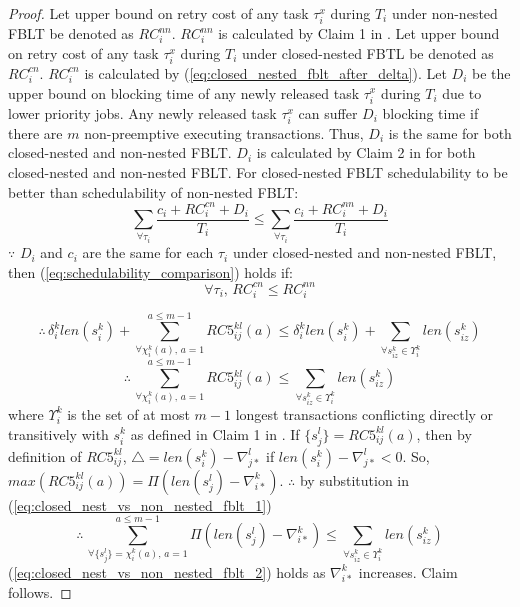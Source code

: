 \documentclass[letter]{sig-alternate}
\begin{document}
\begin{proof}

Let upper bound on retry cost of any task $\tau_{i}^{x}$ during $T_{i}$
under non-nested FBLT be denoted as $RC_{i}^{nn}$. $RC_{i}^{nn}$
is calculated by Claim 1 in \cite{fblt}. Let upper bound on retry
cost of any task $\tau_{i}^{x}$ during $T_{i}$ under closed-nested
FBTL be denoted as $RC_{i}^{cn}$. $RC_{i}^{cn}$ is calculated by
(\ref{eq:closed_nested_fblt_after_delta}). Let $D_{i}$ be the upper
bound on blocking time of any newly released task $\tau_{i}^{x}$
during $T_{i}$ due to lower priority jobs. Any newly released task
$\tau_{i}^{x}$ can suffer $D_{i}$ blocking time if there are $m$
non-preemptive executing transactions. Thus, $D_{i}$ is the same
for both closed-nested and non-nested FBLT. $D_{i}$ is calculated
by Claim 2 in \cite{fblt} for both closed-nested and non-nested FBLT.
For closed-nested FBLT schedulability to be better than schedulability
of non-nested FBLT: 
\begin{equation}
\sum_{\forall\tau_{i}}\frac{c_{i}+RC_{i}^{cn}+D_{i}}{T_{i}}\le\sum_{\forall\tau_{i}}\frac{c_{i}+RC_{i}^{nn}+D_{i}}{T_{i}}\label{eq:schedulability_comparison}
\end{equation}
$\because$ $D_{i}$ and $c_{i}$ are the same for each $\tau_{i}$
under closed-nested and non-nested FBLT, then (\ref{eq:schedulability_comparison})
holds if:
\[
\forall\tau_{i},\, RC_{i}^{cn}\le RC_{i}^{nn}
\]


\[
\therefore\,\delta_{i}^{k}len\left(s_{i}^{k}\right)+\sum_{\forall\chi_{i}^{k}(a),\, a=1}^{a\le m-1}RC5_{ij}^{kl}(a)\le\delta_{i}^{k}len\left(s_{i}^{k}\right)+\sum_{\forall s_{iz}^{k}\in\Upsilon_{i}^{k}}len\left(s_{iz}^{k}\right)
\]
\begin{equation}
\therefore\,\sum_{\forall\chi_{i}^{k}(a),\, a=1}^{a\le m-1}RC5{}_{ij}^{kl}(a)\le\sum_{\forall s_{iz}^{k}\in\Upsilon_{i}^{k}}len\left(s_{iz}^{k}\right)\label{eq:closed_nest_vs_non_nested_fblt_1}
\end{equation}
where $\Upsilon_{i}^{k}$ is the set of at most $m-1$ longest transactions
conflicting directly or transitively with $s_{i}^{k}$ as defined
in Claim 1 in \cite{fblt}. If $\{s_{j}^{l}\}=RC5_{ij}^{kl}(a)$,
then by definition of $RC5_{ij}^{kl}$, $\triangle=len(s_{i}^{k})-\nabla_{j*}^{l}$
if $len(s_{i}^{k})-\nabla_{j*}^{l}<0$. So, $max\left(RC5_{ij}^{kl}(a)\right)=\Pi\left(len(s_{j}^{l})-\nabla_{i*}^{k}\right)$.
$\therefore$ by substitution in (\ref{eq:closed_nest_vs_non_nested_fblt_1})
\begin{equation}
\therefore\,\sum_{\forall\{s_{j}^{l}\}=\chi_{i}^{k}(a),\, a=1}^{a\le m-1}\Pi\left(len(s_{j}^{l})-\nabla_{i*}^{k}\right)\le\sum_{\forall s_{iz}^{k}\in\Upsilon_{i}^{k}}len\left(s_{iz}^{k}\right)\label{eq:closed_nest_vs_non_nested_fblt_2}
\end{equation}
(\ref{eq:closed_nest_vs_non_nested_fblt_2}) holds as $\nabla_{i*}^{k}$
increases. Claim follows.

\end{proof}
\end{document}
